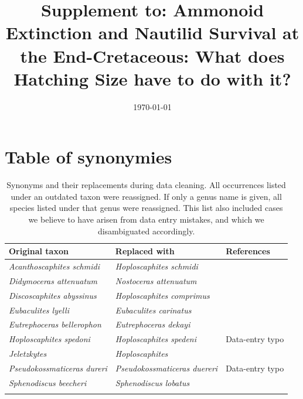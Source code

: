 \documentclass[a4paper]{article}
\title{Supplement to: Ammonoid Extinction and Nautilid Survival at the End-Cretaceous: What does Hatching Size have to do with it?}
\date{\today}
\author{}
\begin{document}
\maketitle

\makeatletter
\renewcommand \thesection{S\@arabic\c@section}
\renewcommand\thetable{S\@arabic\c@table}
\renewcommand \thefigure{S\@arabic\c@figure}
\makeatother


\section*{Table of synonymies}


\begin{table}[H]
\centering
\begin{tabular}{lll}
Original taxon  & Replaced with	& References	 \\
\hline
\textit{Acanthoscaphites schmidi} & \textit{Hoploscaphites schmidi} & \cite{machalskiLateMaastrichtianEarliest2005}\\
\textit{Didymoceras attenuatum} & \textit{Nostoceras attenuatum} & \cite{kuchlerUpperCampanianMaastrichtianAmmonites2001}\\
\textit{Discoscaphites abyssinus} & \textit{Hoploscaphites comprimus} & \cite{landmanScaphitidAmmonitesUpper1993}\\
\textit{Eubaculites lyelli} & \textit{Eubaculites carinatus} & \cite{wardMaastrichtianAmmonitesBiscay1993}\\
\textit{Eutrephoceras bellerophon} & \textit{Eutrephoceras dekayi} & \cite{malchykLateCretaceousEarly}\\ 
\textit{Hoploscaphites spedoni} & \textit{Hoploscaphites spedeni} & Data-entry typo\\
\textit{Jeletzkytes} & \textit{Hoploscaphites} & \cite{landmanScaphitesNodosusGroup2010}\\
\textit{Pseudokossmaticeras dureri} & \textit{Pseudokossmaticeras duereri} & Data-entry typo\\
\textit{Sphenodiscus beecheri} & \textit{Sphenodiscus lobatus} & \cite{kennedy1997new}\\
\hline \\
\end{tabular}
\caption{Synonyms and their replacements during data cleaning. All occurrences listed under an outdated taxon were reassigned. If only a genus name is given, all species listed under that genus were reassigned. This list also included cases we believe to have arisen from data entry mistakes, and which we disambiguated accordingly.}
\label{tab_synonymies}
\end{table}
\end{document}
